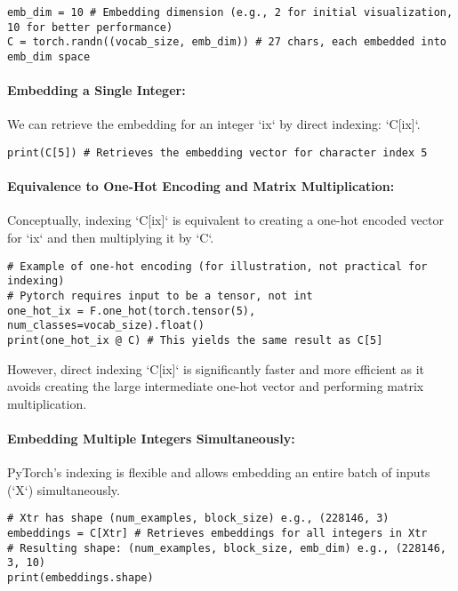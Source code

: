 \begin{lstlisting}[caption=Embedding Table Initialization]
emb_dim = 10 # Embedding dimension (e.g., 2 for initial visualization, 10 for better performance)
C = torch.randn((vocab_size, emb_dim)) # 27 chars, each embedded into emb_dim space
\end{lstlisting}

\paragraph{Embedding a Single Integer:}
We can retrieve the embedding for an integer `ix` by direct indexing: `C[ix]`.

\begin{lstlisting}
print(C[5]) # Retrieves the embedding vector for character index 5
\end{lstlisting}

\paragraph{Equivalence to One-Hot Encoding and Matrix Multiplication:}
Conceptually, indexing `C[ix]` is equivalent to creating a one-hot encoded vector for `ix` and then multiplying it by `C`.

\begin{lstlisting}
# Example of one-hot encoding (for illustration, not practical for indexing)
# Pytorch requires input to be a tensor, not int
one_hot_ix = F.one_hot(torch.tensor(5), num_classes=vocab_size).float()
print(one_hot_ix @ C) # This yields the same result as C[5]
\end{lstlisting}

However, direct indexing `C[ix]` is significantly faster and more efficient as it avoids creating the large intermediate one-hot vector and performing matrix multiplication.

\paragraph{Embedding Multiple Integers Simultaneously:}
PyTorch's indexing is flexible and allows embedding an entire batch of inputs (`X`) simultaneously.

\begin{lstlisting}[caption=Batch Embedding]
# Xtr has shape (num_examples, block_size) e.g., (228146, 3)
embeddings = C[Xtr] # Retrieves embeddings for all integers in Xtr
# Resulting shape: (num_examples, block_size, emb_dim) e.g., (228146, 3, 10)
print(embeddings.shape)
\end{lstlisting}

